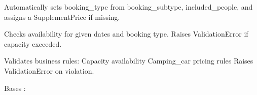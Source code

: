 \documentclass[letterpaper,10pt,french]{sphinxmanual}
\begin{document}
\begin{fulllineitems}

\begin{fulllineitems}
\label{\detokenize{index:bookings.models.Booking.save}}
\pysigstartsignatures
\pysiglinewithargsret
{}
{\sphinxparamcomma {}}
{}
\pysigstopsignatures
\sphinxAtStartPar
Automatically sets booking\_type from booking\_subtype, included\_people,
and assigns a SupplementPrice if missing.

\end{fulllineitems}


\begin{fulllineitems}
\label{\detokenize{index:bookings.models.Booking.check_capacity}}
\pysigstartsignatures
\pysiglinewithargsret
{}
{}
{}
\pysigstopsignatures
\sphinxAtStartPar
Checks availability for given dates and booking type.
Raises ValidationError if capacity exceeded.

\end{fulllineitems}


\begin{fulllineitems}
\label{\detokenize{index:bookings.models.Booking.clean}}
\pysigstartsignatures
\pysiglinewithargsret
{}
{}
{}
\pysigstopsignatures
\sphinxAtStartPar
Validates business rules:
\sphinxhyphen{} Capacity availability
\sphinxhyphen{} Camping\_car pricing rules
Raises ValidationError on violation.

\end{fulllineitems}


\begin{fulllineitems}
\label{\detokenize{index:bookings.models.Booking.DoesNotExist}}
\pysigstartsignatures
\pysigline
{}
\pysigstopsignatures
\sphinxAtStartPar
Bases : 


\end{fulllineitems}
\end{fulllineitems}
\end{document}
